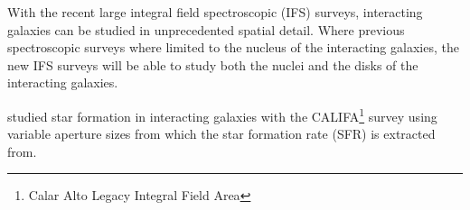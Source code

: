 \documentclass[iop,revtex4,twocolumn,apj,numberedappendix,appendixfloats]{emulateapj}
\begin{document}


With the recent large integral field spectroscopic (IFS) surveys, interacting galaxies can be studied in unprecedented spatial detail. Where previous spectroscopic surveys where limited to the nucleus of the interacting galaxies, the new IFS surveys will be able to study both the nuclei and the disks of the interacting galaxies. 

\citet{Barrera-Ballesteros:2015} studied star formation in interacting galaxies with the CALIFA\footnote{Calar Alto Legacy Integral Field Area} survey using variable aperture sizes from which the star formation rate (SFR) is extracted from. \\


\end{document}
